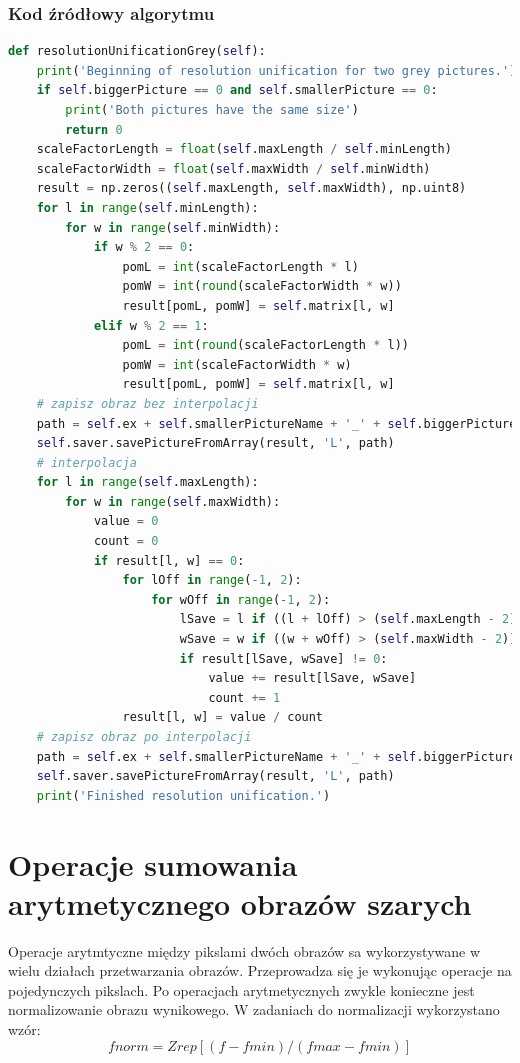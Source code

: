 \documentclass[a4paper,12pt, titlepage]{report}
\begin{document}
\subsection*{Kod źródłowy algorytmu}
\begin{lstlisting}[language=Python]
def resolutionUnificationGrey(self):
    print('Beginning of resolution unification for two grey pictures.')
    if self.biggerPicture == 0 and self.smallerPicture == 0:
        print('Both pictures have the same size')
        return 0
    scaleFactorLength = float(self.maxLength / self.minLength)
    scaleFactorWidth = float(self.maxWidth / self.minWidth)
    result = np.zeros((self.maxLength, self.maxWidth), np.uint8)
    for l in range(self.minLength):
        for w in range(self.minWidth):
            if w % 2 == 0:
                pomL = int(scaleFactorLength * l)
                pomW = int(round(scaleFactorWidth * w))
                result[pomL, pomW] = self.matrix[l, w]
            elif w % 2 == 1:
                pomL = int(round(scaleFactorLength * l))
                pomW = int(scaleFactorWidth * w)
                result[pomL, pomW] = self.matrix[l, w]
    # zapisz obraz bez interpolacji
    path = self.ex + self.smallerPictureName + '_' + self.biggerPictureName + '_withoutInterpolation.png'
    self.saver.savePictureFromArray(result, 'L', path)
    # interpolacja
    for l in range(self.maxLength):
        for w in range(self.maxWidth):
            value = 0
            count = 0
            if result[l, w] == 0:
                for lOff in range(-1, 2):
                    for wOff in range(-1, 2):
                        lSave = l if ((l + lOff) > (self.maxLength - 2)) | ((l + lOff) < 0) else (l + lOff)
                        wSave = w if ((w + wOff) > (self.maxWidth - 2)) | ((w + wOff) < 0) else (w + wOff)
                        if result[lSave, wSave] != 0:
                            value += result[lSave, wSave]
                            count += 1
                result[l, w] = value / count
    # zapisz obraz po interpolacji
    path = self.ex + self.smallerPictureName + '_' + self.biggerPictureName + '_withInterpolation.png'
    self.saver.savePictureFromArray(result, 'L', path)
    print('Finished resolution unification.')
\end{lstlisting}

\chapter{Operacje sumowania arytmetycznego obrazów szarych}
Operacje arytmtyczne między pikslami dwóch obrazów sa wykorzystywane w wielu działach przetwarzania obrazów. Przeprowadza się je wykonując operacje na pojedynczych pikslach. Po operacjach arytmetycznych zwykle konieczne jest normalizowanie obrazu wynikowego. W zadaniach do normalizacji wykorzystano wzór:
\[f{norm}=Z{rep}[(f-f{min})/(f{max}-f{min})]\]
\end{document}
